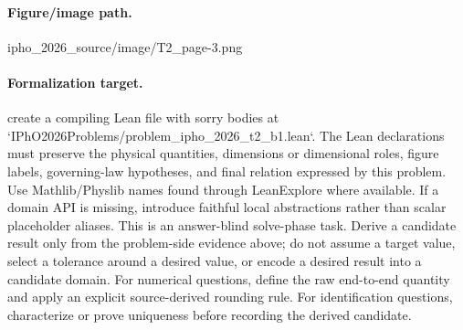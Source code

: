 \paragraph{Figure/image path.}
ipho\_2026\_source/image/T2\_page-3.png

\paragraph{Formalization target.}
create a compiling Lean file with sorry bodies at `IPhO2026Problems/problem\_ipho\_2026\_t2\_b1.lean`.
The Lean declarations must preserve the physical quantities, dimensions or dimensional roles, figure labels, governing-law hypotheses, and final relation expressed by this problem.
Use Mathlib/Physlib names found through LeanExplore where available. If a domain API is missing, introduce faithful local abstractions rather than scalar placeholder aliases.
This is an answer-blind solve-phase task. Derive a candidate result only from the problem-side evidence above; do not assume a target value, select a tolerance around a desired value, or encode a desired result into a candidate domain.
For numerical questions, define the raw end-to-end quantity and apply an explicit source-derived rounding rule. For identification questions, characterize or prove uniqueness before recording the derived candidate.

